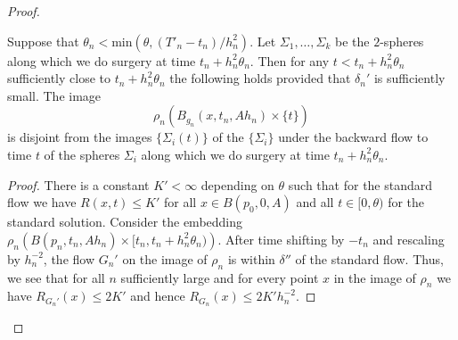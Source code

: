 \begin{proof}
\begin{claim}
\label{claim:ball-disjoint-from-surgery-spheres}
Suppose that $\theta_n<\mathrm{min}(\theta,(T'_n- t_n)/ h_n^2)$. Let
$\Sigma_{1},\ldots,\Sigma_{k}$ be the $2$-spheres along which
we do surgery at time $ t_n+h_n^2\theta_n$. Then for any $t< t_n+
h_n^2\theta_n$ sufficiently close to $ t_n+ h_n^2\theta_n$ the
following holds provided that $\delta_n'$ is sufficiently small. The image
$$\rho_n\left(B_{g_n}(x,t_n,A h_n)\times
\{t\}\right)$$ is disjoint from the images $\{\Sigma_{i}(t)\}$ of the $\{\Sigma_{i}\}$
under the
backward flow to time $t$ of the spheres $\Sigma_{i}$ along which
we do surgery at time $t_n+h_n^2\theta_n$.
\end{claim}

\begin{proof}
There is a constant $K'<\infty$ depending on $\theta$ such that for
the standard flow we have $R(x,t)\le K'$ for all $x\in B(p_0,0,A)$
and all $t\in [0,\theta)$ for the standard solution. Consider the
embedding $\rho_n\left(B(p_n,t_n,Ah_n)\times [t_n,t_n+h_n^2
\theta_n)\right)$. After time shifting by $-t_n$ and rescaling by
$h_n^{-2}$, the flow $G_n'$ on the image of $\rho_n$ is within
$\delta''$ of the standard flow. Thus, we see that for all $n$ sufficiently
large and for every point $x$ in the image of $\rho_n$ we have $
R_{G_n'}(x)\le 2K'$ and hence $R_{G_n}(x)\le 2K'h_n^{-2}$.



\end{proof}
\end{proof}
